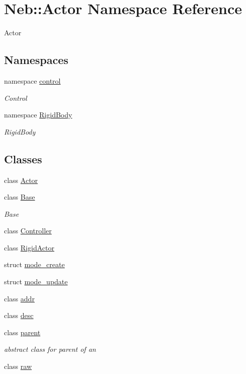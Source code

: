 \hypertarget{namespaceNeb_1_1Actor}{\section{\-Neb\-:\-:\-Actor \-Namespace \-Reference}
\label{namespaceNeb_1_1Actor}
}


\-Actor  


\subsection*{\-Namespaces}
\begin{DoxyCompactItemize}
\item 
namespace \hyperlink{namespaceNeb_1_1Actor_1_1control}{control}
\begin{DoxyCompactList}\small\item\em \-Control \end{DoxyCompactList}\item 
namespace \hyperlink{namespaceNeb_1_1Actor_1_1RigidBody}{\-Rigid\-Body}
\begin{DoxyCompactList}\small\item\em \-Rigid\-Body \end{DoxyCompactList}\end{DoxyCompactItemize}
\subsection*{\-Classes}
\begin{DoxyCompactItemize}
\item 
class \hyperlink{classNeb_1_1Actor_1_1Actor}{\-Actor}
\item 
class \hyperlink{classNeb_1_1Actor_1_1Base}{\-Base}
\begin{DoxyCompactList}\small\item\em \-Base \end{DoxyCompactList}\item 
class \hyperlink{classNeb_1_1Actor_1_1Controller}{\-Controller}
\item 
class \hyperlink{classNeb_1_1Actor_1_1RigidActor}{\-Rigid\-Actor}
\item 
struct \hyperlink{structNeb_1_1Actor_1_1mode__create}{mode\-\_\-create}
\item 
struct \hyperlink{structNeb_1_1Actor_1_1mode__update}{mode\-\_\-update}
\item 
class \hyperlink{classNeb_1_1Actor_1_1addr}{addr}
\item 
class \hyperlink{classNeb_1_1Actor_1_1desc}{desc}
\item 
class \hyperlink{classNeb_1_1Actor_1_1parent}{parent}
\begin{DoxyCompactList}\small\item\em abstract class for parent of an  \end{DoxyCompactList}\item 
class \hyperlink{classNeb_1_1Actor_1_1raw}{raw}
\end{DoxyCompactItemize}
